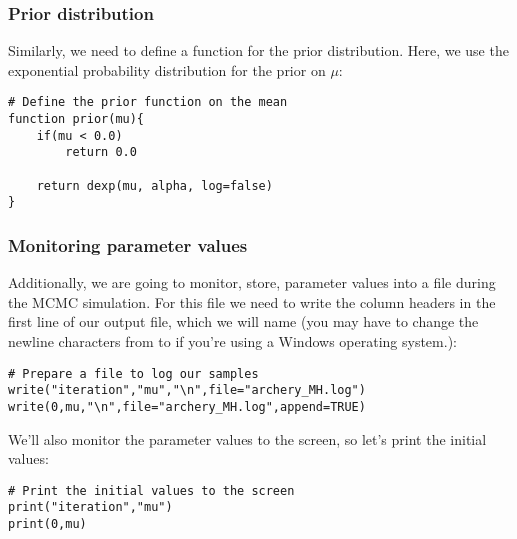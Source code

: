 \subsubsection{Prior distribution}
Similarly, we need to define a function for the prior distribution.
Here, we use the exponential probability distribution for the prior on $\mu$:
{\tt \begin{snugshade*}
\begin{lstlisting}    
# Define the prior function on the mean 
function prior(mu){
    if(mu < 0.0)
        return 0.0

    return dexp(mu, alpha, log=false)
}
\end{lstlisting}
\end{snugshade*}}



\subsubsection{Monitoring parameter values}
Additionally, we are going to monitor, \IE store, parameter values into a file during the MCMC simulation.
For this file we need to write the column headers in the first line of our output file, which we will name  (you may have to change the newline characters from  to  if you're using a Windows operating system.):
{\tt \begin{snugshade*}
\begin{lstlisting}
# Prepare a file to log our samples
write("iteration","mu","\n",file="archery_MH.log")
write(0,mu,"\n",file="archery_MH.log",append=TRUE)
\end{lstlisting}
\end{snugshade*}}

We'll also monitor the parameter values to the screen, so let's print the initial values:
{\tt \begin{snugshade*}
\begin{lstlisting}
# Print the initial values to the screen
print("iteration","mu")
print(0,mu)
\end{lstlisting}
\end{snugshade*}}

